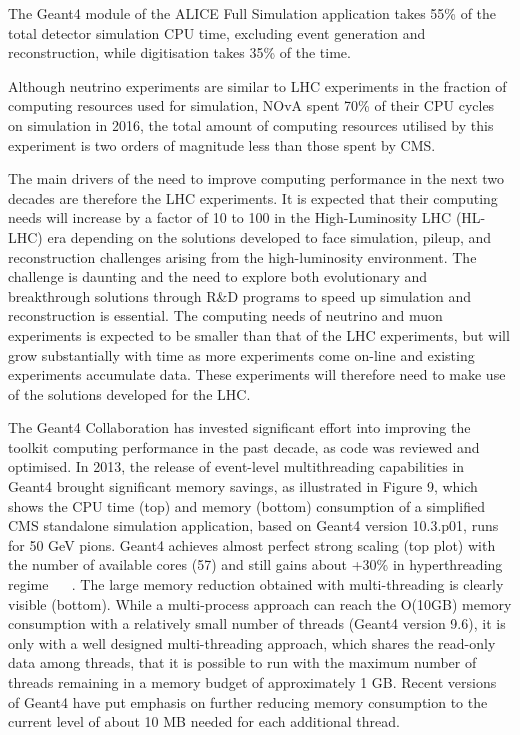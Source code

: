 \documentclass[12pt,a4paper]{article}
\begin{document}
{The Geant4 module of the ALICE Full Simulation application takes 55\% of
the total detector simulation CPU time, excluding event generation and
reconstruction, while digitisation takes 35\% of the time.

Although neutrino experiments are similar to LHC experiments in the
fraction of computing resources used for simulation, NOvA spent 70\% of
their CPU cycles on simulation in 2016, the total amount of computing
resources utilised by this experiment is two orders of magnitude less
than those spent by CMS.

The main drivers of the need to improve computing performance in the
next two decades are therefore the LHC experiments. It is expected that
their computing needs will increase by a factor of 10 to 100 in the
High-Luminosity LHC (HL-LHC) era depending on the solutions developed to
face simulation, pileup, and reconstruction challenges arising from the
high-luminosity environment. The challenge is daunting and the need to
explore both evolutionary and breakthrough solutions through R\&D
programs to speed up simulation and reconstruction is essential. The
computing needs of neutrino and muon experiments is expected to be
smaller than that of the LHC experiments, but will grow substantially
with time as more experiments come on-line and existing experiments
accumulate data. These experiments will therefore need to make use of
the solutions developed for the LHC.

The Geant4 Collaboration has invested significant effort into improving
the toolkit computing performance in the past decade, as code was
reviewed and optimised. In 2013, the release of event-level
multithreading capabilities in Geant4 brought significant memory
savings, as illustrated in Figure 9, which shows the CPU time (top) and
memory (bottom) consumption of a simplified CMS standalone simulation
application, based on Geant4 version 10.3.p01, runs for 50 GeV pions.
Geant4 achieves almost perfect strong scaling (top plot) with the number
of available cores (57) and still gains about +30\% in hyperthreading
regime ~\cite{G4CPUPerf} ~\cite{Dotti:2016ors}. The large memory reduction obtained with
multi-threading is clearly visible (bottom). While a multi-process
approach can reach the O(10GB) memory consumption with a relatively
small number of threads (Geant4 version 9.6), it is only with a well
designed multi-threading approach, which shares the read-only data among
threads, that it is possible to run with the maximum number of threads
remaining in a memory budget of approximately 1 GB. Recent versions of
Geant4 have put emphasis on further reducing memory consumption to the
current level of about 10 MB needed for each additional thread.

}
\end{document}
